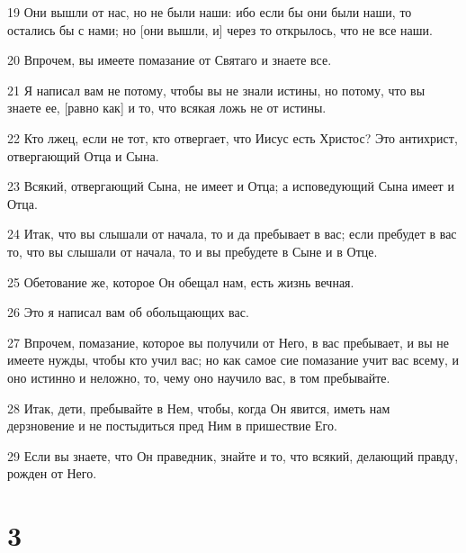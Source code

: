 \par 19 Они вышли от нас, но не были наши: ибо если бы они были наши, то остались бы с нами; но [они вышли, и] через то открылось, что не все наши.
\par 20 Впрочем, вы имеете помазание от Святаго и знаете все.
\par 21 Я написал вам не потому, чтобы вы не знали истины, но потому, что вы знаете ее, [равно как] и то, что всякая ложь не от истины.
\par 22 Кто лжец, если не тот, кто отвергает, что Иисус есть Христос? Это антихрист, отвергающий Отца и Сына.
\par 23 Всякий, отвергающий Сына, не имеет и Отца; а исповедующий Сына имеет и Отца.
\par 24 Итак, что вы слышали от начала, то и да пребывает в вас; если пребудет в вас то, что вы слышали от начала, то и вы пребудете в Сыне и в Отце.
\par 25 Обетование же, которое Он обещал нам, есть жизнь вечная.
\par 26 Это я написал вам об обольщающих вас.
\par 27 Впрочем, помазание, которое вы получили от Него, в вас пребывает, и вы не имеете нужды, чтобы кто учил вас; но как самое сие помазание учит вас всему, и оно истинно и неложно, то, чему оно научило вас, в том пребывайте.
\par 28 Итак, дети, пребывайте в Нем, чтобы, когда Он явится, иметь нам дерзновение и не постыдиться пред Ним в пришествие Его.
\par 29 Если вы знаете, что Он праведник, знайте и то, что всякий, делающий правду, рожден от Него.

\chapter{3}

